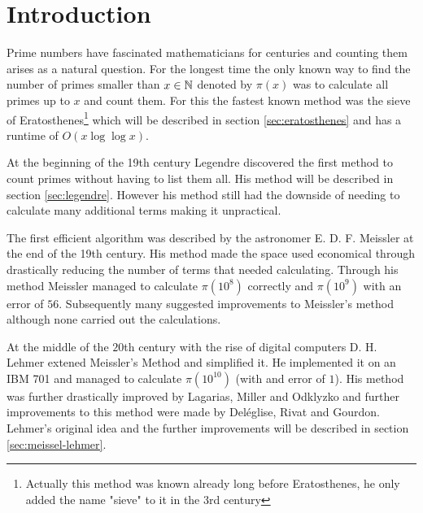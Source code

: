 %

\usepackage{todonotes}
\usepackage{biblatex}
%

\usepackage[stable]{footmisc}
\usepackage{caption}
\usepackage{subcaption}
\usepackage{listings}
\lstset{
	breakatwhitespace=True,
	breaklines=True,
	tabsize=2,
	extendedchars=True,
	keepspaces=True
}

	


\section{Introduction}
Prime numbers have fascinated mathematicians for centuries and counting them arises as a natural question.
For the longest time the only known way to find the number of primes smaller than $x \in \mathbb{N}$ denoted by $\pi(x)$ 
was to calculate all primes up to $x$ and count them.
For this the fastest known method was the sieve of Eratosthenes\footnote{Actually this
method was known already long before Eratosthenes, he only added the name  "sieve" to it in the 3rd century}
which will be described in section \ref{sec:eratosthenes} and has a runtime of $O(x \log \log x)$.

At the beginning of the 19th century Legendre discovered the first method to count primes without having to list them all.
His method will be described in section \ref{sec:legendre}. However his method still had the downside of needing to calculate many additional terms
making it unpractical.

The first efficient algorithm was described by the astronomer E. D. F. Meissler at the end of the 19th century.
His method made the space used economical through drastically reducing the number of terms that needed calculating.
Through his method Meissler managed to calculate $\pi(10^{8})$ correctly and $\pi(10^{9})$ with an error of $56$.
Subsequently many suggested improvements to Meissler's method although none carried out the calculations.

At the middle of the $20$th century with the rise of digital computers D. H. Lehmer extened Meissler's
Method and simplified it. He implemented it on an IBM 701 and managed to calculate  $\pi(10^{10})$ (with and error of $1$).
His method was further drastically improved by Lagarias, Miller and Odklyzko and further improvements to this method were made 
by Deléglise, Rivat and Gourdon. Lehmer's original idea and the further improvements will be described in section \ref{sec:meissel-lehmer}.

